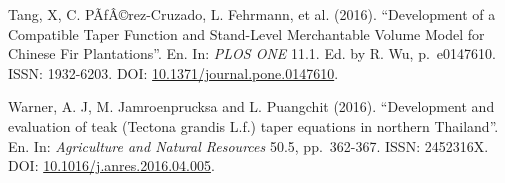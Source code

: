 \documentclass[]{article}
\begin{document}
Tang, X, C. PÃƒÂ©rez-Cruzado, L. Fehrmann, et al. (2016). ``Development
of a Compatible Taper Function and Stand-Level Merchantable Volume Model
for Chinese Fir Plantations''. En. In: \emph{PLOS ONE} 11.1. Ed. by R.
Wu, p.~e0147610. ISSN: 1932-6203. DOI:
\href{https://doi.org/10.1371/journal.pone.0147610}{10.1371/journal.pone.0147610}.

Warner, A. J, M. Jamroenprucksa and L. Puangchit (2016). ``Development
and evaluation of teak (Tectona grandis L.f.) taper equations in
northern Thailand''. En. In: \emph{Agriculture and Natural Resources}
50.5, pp.~362-367. ISSN: 2452316X. DOI:
\href{https://doi.org/10.1016/j.anres.2016.04.005}{10.1016/j.anres.2016.04.005}.
\end{document}
